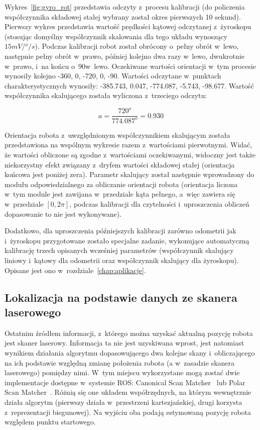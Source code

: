 Wykres~\ref{fig:gyro_rot} przedstawia odczyty z~procesu kalibracji (do
policzenia współczynnika składowej stałej wybrany został okres pierwszych 10
sekund). Pierwszy wykres przedstawia wartość prędkości kątowej odczytanej 
z~żyroskopu (stosując domyślny współczynnik skalowania dla tego układu wynoszący
$15mV/{}^o/s$). Podczas kalibracji robot został obrócony o~pełny obrót 
w~lewo, następnie pełny obrót w~prawo, później kolejno dwa razy w~lewo, dwukrotnie
w~prawo, i~na końcu o~90\textdegree w~lewo. Oczekiwane wartości orientacji w~tym
procesie wynosiły kolejno -360\textdegree, 0\textdegree, -720\textdegree,
0\textdegree, -90\textdegree. Wartości odczytane w~punktach charakterystycznych
wynosiły: -385.743\textdegree, 0.047\textdegree, -774.087\textdegree,
-5.743\textdegree, -98.677\textdegree. Wartość współczynnika skalującego została
wyliczona z~trzeciego odczytu:

\[
a = \frac{720^o}{774.087^o} = 0.930
\]

Orientacja robota z~uwzględnionym współczynnikiem skalującym została
przedstawiona na wspólnym wykresie razem z~wartościami pierwotnymi. Widać, że
wartości obliczone są zgodne z~wartościami oczekiwanymi, widoczny jest także
niekorzystny efekt związany z~dryfem wartości składowej stałej (orientacja
końcowa jest poniżej zera). Parametr skalujący został następnie wprowadzony
do modułu odpowiedzialnego za obliczanie orientacji robota (orientacja liczona
w~tym module jest zawijana w~przedziale kąta pełnego, a~więc zawiera się 
w~przedziale $[0, 2\pi]$, podczas kalibracji dla czytelności i~uproszczenia
obliczeń dopasowanie to nie jest wykonywane).

Dodatkowo, dla uproszczenia późniejszych kalibracji zarówno odometrii jak 
i~żyroskopu przygotowane zostało specjalne zadanie, wykonujące automatyczną
kalibrację trzech opisanych wcześniej parametrów (współczynnik skalujący
liniowy i~kątowy dla odometrii oraz współczynnik skalujący dla żyroskopu).
Opisane jest ono w~rozdziale~\ref{chap:aplikacje}.

\subsection{Lokalizacja na podstawie danych ze skanera laserowego}

Ostatnim źródłem informacji, z~którego można uzyskać aktualną pozycję robota
jest skaner laserowy. Informacja ta nie jest uzyskiwana wprost, jest natomiast
wynikiem działania algorytmu dopasowującego dwa kolejne skany i~obliczającego
na ich podstawie względną zmianę położenia robota (a w~zasadzie skanera laserowego)
pomiędzy nimi. W~tym miejscu wykorzystane mogą zostać dwie implementacje
dostępne w~systemie ROS: Canonical Scan Matcher~\cite{4543181} lub Polar Scan
Matcher~\cite{laser_slam}. Różnią się one układem współrzędnych, na którym
wewnętrznie działa algorytm (pierwszy działa w~przestrzeni kartezjańskiej,
drugi korzysta z~reprezentacji biegunowej). Na wyjściu oba podają estymowaną
pozycję robota względem punktu startowego.

